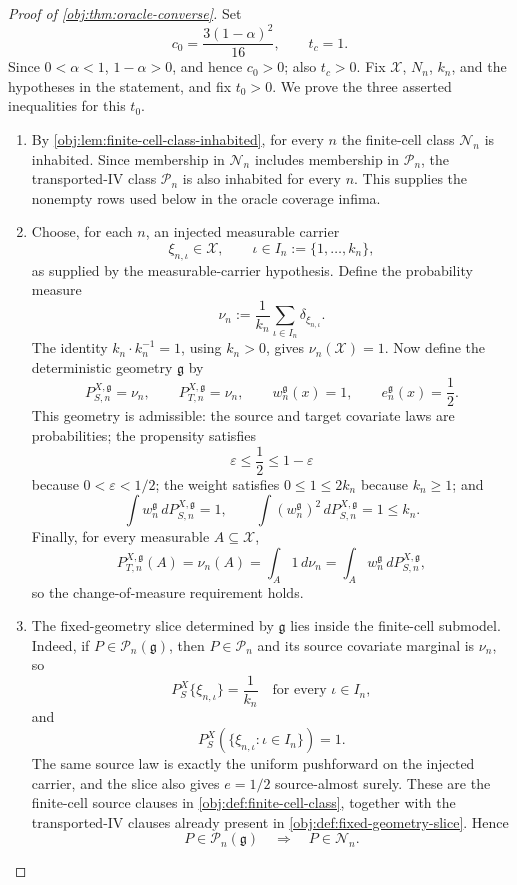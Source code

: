 \begin{proof}[Proof of \cref{obj:thm:oracle-converse}]
Set
\[
  c_0=\frac{3(1-\alpha)^2}{16},
  \qquad
  t_c=1 .
\]
Since \(0<\alpha<1\), \(1-\alpha>0\), and hence \(c_0>0\); also \(t_c>0\).
Fix \(\mathcal X\), \(N_n\), \(k_n\), and the hypotheses in the statement, and fix
\(t_0>0\). We prove the three asserted inequalities for this \(t_0\).
\begin{enumerate}
\item By \cref{obj:lem:finite-cell-class-inhabited}, for every \(n\) the finite-cell class
\(\mathcal N_n\) is inhabited. Since membership in \(\mathcal N_n\) includes membership in
\(\mathcal P_n\), the transported-IV class \(\mathcal P_n\) is also inhabited for every \(n\).
This supplies the nonempty rows used below in the oracle coverage infima. %

\item Choose, for each \(n\), an injected measurable carrier
\[
  \xi_{n,\iota}\in\mathcal X,
  \qquad
  \iota\in I_n:=\{1,\ldots,k_n\},
\]
as supplied by the measurable-carrier hypothesis. Define the probability measure
\[
  \nu_n
  :=
  \frac1{k_n}\sum_{\iota\in I_n}\delta_{\xi_{n,\iota}} .
\]
The identity \(k_n\cdot k_n^{-1}=1\), using \(k_n>0\), gives
\(\nu_n(\mathcal X)=1\). Now define the deterministic geometry \(\mathfrak g\) by
\[
  P^{X,\mathfrak g}_{S,n}=\nu_n,
  \qquad
  P^{X,\mathfrak g}_{T,n}=\nu_n,
  \qquad
  w^{\mathfrak g}_n(x)=1,
  \qquad
  e^{\mathfrak g}_n(x)=\frac12 .
\]
This geometry is admissible: the source and target covariate laws are probabilities; the
propensity satisfies
\[
  \varepsilon\le \frac12\le 1-\varepsilon
\]
because \(0<\varepsilon<1/2\); the weight satisfies \(0\le 1\le 2k_n\) because
\(k_n\ge1\); and
\[
  \int w^{\mathfrak g}_n\,dP^{X,\mathfrak g}_{S,n}=1,
  \qquad
  \int (w^{\mathfrak g}_n)^2\,dP^{X,\mathfrak g}_{S,n}=1\le k_n .
\]
Finally, for every measurable \(A\subseteq\mathcal X\),
\[
  P^{X,\mathfrak g}_{T,n}(A)
  =
  \nu_n(A)
  =
  \int_A 1\,d\nu_n
  =
  \int_A w^{\mathfrak g}_n\,dP^{X,\mathfrak g}_{S,n},
\]
so the change-of-measure requirement holds. %

\item The fixed-geometry slice determined by \(\mathfrak g\) lies inside the finite-cell
submodel. Indeed, if
\(P\in\mathcal P_n(\mathfrak g)\), then \(P\in\mathcal P_n\) and its source covariate marginal
is \(\nu_n\), so
\[
  P_S^X\{\xi_{n,\iota}\}=\frac1{k_n}
  \quad\text{for every }\iota\in I_n,
\]
and
\[
  P_S^X\!\left(\{\xi_{n,\iota}:\iota\in I_n\}\right)=1 .
\]
The same source law is exactly the uniform pushforward on the injected carrier, and the slice
also gives \(e=1/2\) source-almost surely. These are the finite-cell source clauses in
\cref{obj:def:finite-cell-class}, together with the transported-IV clauses already present in
\cref{obj:def:fixed-geometry-slice}. Hence
\[
  P\in\mathcal P_n(\mathfrak g)
  \quad\Longrightarrow\quad
  P\in\mathcal N_n .
\] %


\end{enumerate}
\end{proof}

